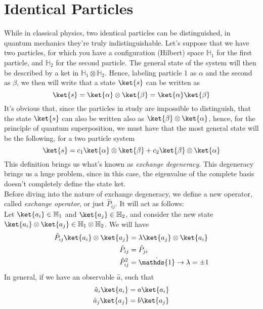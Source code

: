 \documentclass[a4paper, 11pt]{book}
\newcommand{\1}{\opr{\mathds{1}}}
\newcommand{\opr}[1]{\hat{#1}}
\newcommand{\hilbert}{\mathbb{H}}
\theoremstyle{plain}
\begin{document}
	\chapter{Identical Particles}
	While in classical physics, two identical particles can be distinguished, in quantum mechanics they're truly indistinguishable. Let's suppose that we have two particles, for which you have a configuration (Hilbert) space $\hilbert_1$ for the first particle, and $\hilbert_2$ for the second particle. The general state of the system will then be described by a ket in $\hilbert_1\otimes\hilbert_2$. Hence, labeling particle 1 as $\alpha$ and the second as $\beta$, we then will write that a state $\ket{s}$ can be written as
	\begin{equation}
		\ket{s}=\ket{\alpha}\otimes\ket{\beta}=\ket{\alpha}\ket{\beta}
		\label{eq:generalstate2part}
	\end{equation}
	It's obvious that, since the particles in study are impossible to distinguish, that the state $\ket{s}$ can also be written also as $\ket{\beta}\otimes\ket{\alpha}$, hence, for the principle of quantum superposition, we must have that the most general state will be the following, for a two particle system
	\begin{equation}
		\ket{s}=c_1\ket{\alpha}\otimes\ket{\beta}+c_2\ket{\beta}\otimes\ket{\alpha}
		\label{eq:mostgeneral2partstate}
	\end{equation}
	This definition brings us what's known as \textit{exchange degeneracy}. This degeneracy brings us a huge problem, since in this case, the eigenvalue of the complete basis doesn't completely define the state ket.\\
	Before diving into the nature of exchange degeneracy, we define a new operator, called \textit{exchange operator}, or just $\opr{P}_{ij}$. It will act as follows:\\
	Let $\ket{a_i}\in\hilbert_1$ and $\ket{a_j}\in\hilbert_2$, and consider the new state $\ket{a_i}\otimes\ket{a_j}\in\hilbert_1\otimes\hilbert_2$. We will have
	\begin{equation*}
		\begin{aligned}
			\opr{P}_{ij}\ket{a_i}\otimes\ket{a_j}&=\lambda\ket{a_j}\otimes\ket{a_i}\\
			\opr{P}_{ij}&=\opr{P}_{ji}\\
			\opr{P}_{ij}^2&=\1\to\lambda=\pm1
		\end{aligned}
	\end{equation*}
	In general, if we have an observable $\opr{a}$, such that
	\begin{equation*}
		\begin{aligned}
			\opr{a}_i\ket{a_i}&=a\ket{a_i}\\
			\opr{a}_j\ket{a_j}&=b\ket{a_j}
		\end{aligned}
	\end{equation*}
\end{document}
